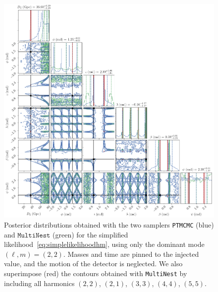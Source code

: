 \documentclass[aps,showpacs,twocolumn,prd,superscriptaddress,nofootinbib]{revtex4-1}
\begin{document}
\begin{figure}
  \centering
  \includegraphics[width=.8\linewidth]{../plots/corner_smbh_case9_simplelike_ptmcmc_bambi.png}
  \caption{Posterior distributions obtained with the two samplers \texttt{PTMCMC} (blue) and $\texttt{MultiNest}$ (green) for the simplified likelihood~\eqref{eq:simplelikelihoodhm}, using only the dominant mode $(\ell, m) = (2,2)$. Masses and time are pinned to the injected value, and the motion of the detector is neglected. We also superimpose (red) the contours obtained with \texttt{MultiNest} by including all harmonics $(2,2)$, $(2,1)$, $(3,3)$, $(4,4)$, $(5,5)$.}
  \label{fig:PEsmbh22hmSimpleLikeCase9}
\end{figure}
\end{document}
